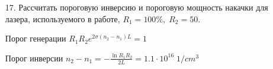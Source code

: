 \documentclass[a4paper]{article}
\begin{document}
\begin{itemize}
	\item[17.] Рассчитать пороговую инверсию и пороговую мощность накачки для лазера, используемого в работе, $R_1=100\%,\; R_2=50$. \par 
		Порог генерации $R_1R_2 e^{2 \sigma (n_2-n_1)L} = 1$ \par 
		Порог инверсии $n_2-n_1 = - \frac{\ln{R_1R_2}}{2 L} = 1.1 \cdot 10^{16}\; 1/cm^3$
	
\end{itemize}
\end{document}
